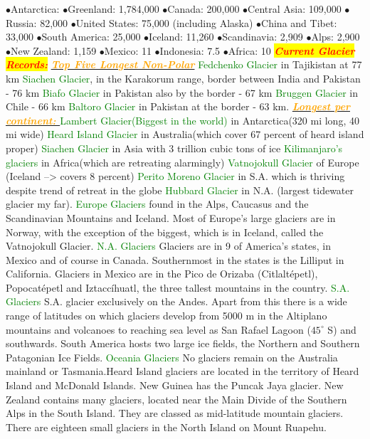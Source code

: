 \documentclass{article}
\newcommand{\ddd}{$\bullet$}
\newcommand{\red}[1]{\textcolor{red}{#1}}
\newcommand{\green}[1]{\textcolor{green}{#1}}
\newcommand{\pink}[1]{\textcolor{magenta}{#1}}
\newcommand{\orange}[1]{\textcolor{orange}{#1}}
\newcommand{\mysection}[1]{\colorbox{yellow}{\textbf{\textit{\red{#1}}}}}
\newcommand{\mysub}[1]{\underline{\textbf{{\textit{\orange{#1}}}}}}
\newcommand{\mysubsub}[1]{{{\green{#1}}}}
\begin{document}
\begin{multicols*}{4}
            \ddd Antarctica:	\pink{ }
            \ddd Greenland:	1,784,000
            \ddd Canada: 200,000
            \ddd Central Asia:	109,000
            \ddd Russia:	82,000
            \ddd United States:	75,000 (including Alaska)
            \ddd China and Tibet:	33,000
            \ddd South America: 25,000
            \ddd Iceland:	11,260
            \ddd Scandinavia:	2,909
            \ddd Alps: 2,900
            \ddd New Zealand:	1,159
            \ddd Mexico: 11
            \ddd Indonesia:	7.5
            \ddd Africa: 10
		\mysection{Current Glacier Records:} 
		    \mysub{Top Five Longest Non-Polar}
		    \mysubsub {Fedchenko Glacier} in Tajikistan at 77 km
		    \mysubsub {Siachen Glacier}, in the Karakorum range, border between India and Pakistan - 76 km
		    \mysubsub {Biafo Glacier} in Pakistan also by the border - 67 km
		    \mysubsub {Bruggen Glacier} in Chile - 66 km
		    \mysubsub {Baltoro Glacier} in Pakistan at the border - 63 km. \mysub{Longest per continent: } 
		    \mysubsub {Lambert Glacier(Biggest in the world)} in Antarctica(320 mi long, 40 mi wide)
		    \mysubsub {Heard Island Glacier} in Australia(which cover 67 percent of heard island proper)
		    \mysubsub {Siachen Glacier} in Asia with 3 trillion cubic tons of ice
		    \mysubsub {Kilimanjaro's glaciers} in Africa(which are retreating alarmingly)
		    \mysubsub {Vatnojokull Glacier} of Europe (Iceland --> covers 8 percent)
		    \mysubsub {Perito Moreno Glacier} in S.A. which is thriving despite trend of retreat in the globe
		    \mysubsub {Hubbard Glacier} in N.A. (largest tidewater glacier my far). 
		    \mysubsub{Europe Glaciers} found in the Alps, Caucasus and the Scandinavian Mountains and Iceland. Most of Europe's large glaciers are in Norway, with the exception of the biggest, which is in Iceland, called the Vatnojokull Glacier.
		    \mysubsub{N.A. Glaciers} Glaciers are in 9 of America's states, in Mexico and of course in Canada. Southernmost in the states is the Lilliput in California. Glaciers in Mexico are in the Pico de Orizaba (Citlaltépetl), Popocatépetl and Iztaccíhuatl, the three tallest mountains in the country.
		    \mysubsub{S.A. Glaciers} S.A. glacier exclusively on the Andes. Apart from this there is a wide range of latitudes on which glaciers develop from 5000 m in the Altiplano mountains and volcanoes to reaching sea level as San Rafael Lagoon ($ 45^\circ $ S) and southwards. South America hosts two large ice fields, the Northern and Southern Patagonian Ice Fields.
		    \mysubsub{Oceania Glaciers} No glaciers remain on the Australia mainland or Tasmania.Heard Island glaciers are located in the territory of Heard Island and McDonald Islands. New Guinea has the Puncak Jaya glacier. New Zealand contains many glaciers,  located near the Main Divide of the Southern Alps in the South Island. They are classed as mid-latitude mountain glaciers. There are eighteen small glaciers in the North Island on Mount Ruapehu.

\end{multicols*}
\end{document}
